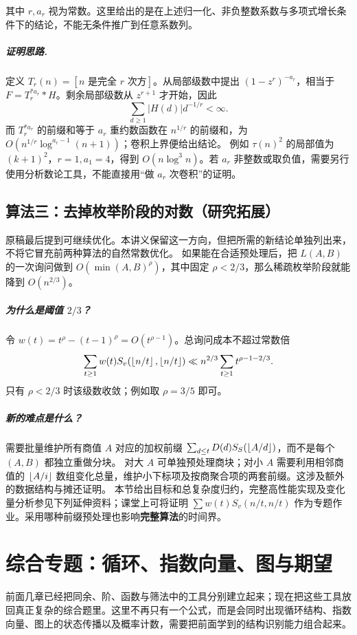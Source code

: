 其中 $r,a_r$ 视为常数。这里给出的是在上述归一化、非负整数系数与多项式增长条件下的结论，不能无条件推广到任意系数列。

\paragraph{证明思路.} 定义 $T_r(n)=[n\text{ 是完全 }r\text{ 次方}]$。从局部级数中提出 $(1-z^r)^{-a_r}$，相当于 $F=T_r^{*a_r}*H$。剩余局部级数从 $z^{r+1}$ 才开始，因此
\[
 \sum_{d\ge1}|H(d)|d^{-1/r}<\infty.
\]
而 $T_r^{*a_r}$ 的前缀和等于 $a_r$ 重约数函数在 $n^{1/r}$ 的前缀和，为 $O(n^{1/r}\log^{a_r-1}(n+1))$；卷积上界便给出结论。
例如 $\tau(n)^2$ 的局部值为 $(k+1)^2$，$r=1,a_1=4$，得到 $O(n\log^3 n)$。若 $a_r$ 非整数或取负值，需要另行使用分析数论工具，不能直接用“做 $a_r$ 次卷积”的证明。


\section{算法三：去掉枚举阶段的对数（研究拓展）}
原稿最后提到可继续优化。本讲义保留这一方向，但把所需的新结论单独列出来，不将它冒充前两种算法的自然常数优化。
如果能在合适预处理后，把 $L(A,B)$ 的一次询问做到 $O(\min(A,B)^\rho)$，其中固定 $\rho<2/3$，那么稀疏枚举阶段就能降到 $O(n^{2/3})$。

\paragraph{为什么是阈值 $2/3$？}
令 $w(t)=t^\rho-(t-1)^\rho=O(t^{\rho-1})$。总询问成本不超过常数倍
\[
\sum_{t\ge1}w(t)S_v(\left\lfloor n/t\right\rfloor,\left\lfloor n/t\right\rfloor)
\ll n^{2/3}\sum_{t\ge1}t^{\rho-1-2/3}.
\]
只有 $\rho<2/3$ 时该级数收敛；例如取 $\rho=3/5$ 即可。

\paragraph{新的难点是什么？}
需要批量维护所有商值 $A$ 对应的加权前缀
$\sum_{d\le t}D(d)S_S(\left\lfloor A/d\right\rfloor)$，而不是每个 $(A,B)$ 都独立重做分块。
对大 $A$ 可单独预处理商块；对小 $A$ 需要利用相邻商值的 $\left\lfloor A/i\right\rfloor$ 数组变化总量，维护小下标项及按商聚合项的两套前缀。这涉及额外的数据结构与摊还证明。
本节给出目标和总复杂度归约，完整高性能实现及变化量分析参见下列延伸资料；课堂上可将证明 $\sum w(t)S_v(n/t,n/t)$ 作为专题作业。采用哪种前缀预处理也影响\textbf{完整算法}的时间界。



\chapter{综合专题：循环、指数向量、图与期望}
\begin{chapterintro}[章节导读]
前面几章已经把同余、阶、函数与筛法中的工具分别建立起来；现在把这些工具放回真正复杂的综合题里。这里不再只有一个公式，而是会同时出现循环结构、指数向量、图上的状态传播以及概率计数，需要把前面学到的结构识别能力组合起来。
\end{chapterintro}

